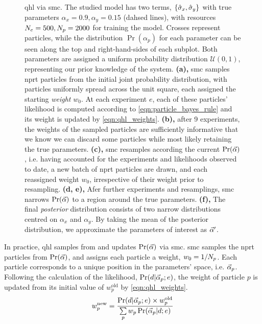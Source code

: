 \begin{figure}
{    }
    \caption[Quantum Hamiltonian learning via sequential Monte Carlo]{
        \Acrfull{qhl} via \gls{smc}. 
        The studied model has two terms, $\{\hat{\sigma}_{x}, \hat{\sigma}_{y}\}$ with true parameters $\alpha_{x}=0.9, \alpha_y=0.15$ (dahsed lines), 
            with resources $N_e=500, N_p=2000$ for training the model. 
        Crosses represent \glspl{particle}, while the distribution $\Pr(\alpha_p)$ for each 
            parameter can be seen along the top and right-hand-sides of each subplot. 
        Both parameters are assigned a uniform probability distribution $\mathcal{U}(0,1)$, representing our prior knowledge of the system. 
        \textbf{(a),} \gls{smc} samples \gls{nprt} \glspl{particle} from the initial joint probability distribution, 
            with \glspl{particle} uniformly spread across the unit square, each assigned the starting \emph{weight} $w_0$. 
            At each experiment $e$, each of these \glspl{particle}' \gls{likelihood} is computed according to \cref{eqn:particle_bayes_rule}
            and its weight is updated by \cref{eqn:qhl_weights}.
        \textbf{(b),} after 9 experiments, the weights of the sampled \glspl{particle} are sufficiently informative that we know we can 
            discard some \glspl{particle} while most likely retaining the true parameters. 
        \textbf{(c),} \gls{smc} resamples according the current $\Pr(\vec{\alpha})$, 
            i.e. having accounted for the experiments and \glspl{likelihood}  observed to date, 
            a new batch of \gls{nprt} \glspl{particle} are drawn, and each reassigned weight $w_0$, 
            irrespective of their weight prior to resampling.  
        \textbf{(d, e),} Afer further experiments and resamplings, \gls{smc} narrows $\Pr(\vec{\alpha})$ to a region around the true parameters. 
        \textbf{(f),} The final \emph{posterior} distribution consists of two narrow distributions centred on $\alpha_x$ and $\alpha_y$. 
        By taking the mean of the posterior distribution, we approximate the parameters of interest as $\vec{\alpha}^{\prime}$. 
    }
    \label{fig:qhl_smc}
\end{figure}
In practice, \gls{qhl} samples from and updates $\Pr(\vec{\alpha})$  via \gls{smc}.
\gls{smc} samples the \gls{nprt} \glspl{particle} from $\Pr(\vec{\alpha})$, and assigns each \gls{particle} a weight, $w_0 = 1/N_p$.
Each \gls{particle} corresponds to a unique position in the parameters' space, i.e. $\vec{\alpha}_p$.
Following the calculation of the likelihood, $\Pr(d | \vec{\alpha}_p; e)$, 
    the weight of \gls{particle} $p$ is updated from its initial value of $w_p^{\textrm{old}}$ by \cref{eqn:qhl_weights}.
\begin{equation}\label{eqn:qhl_weights}
    w_p^{\textrm{new}} = \frac{\Pr(d | \vec{\alpha}_p; e) \times w_p^{\textrm{old}} } { \sum\limits_{p} w_p \Pr(\vec{\alpha}_p | d; e) }
\end{equation}

